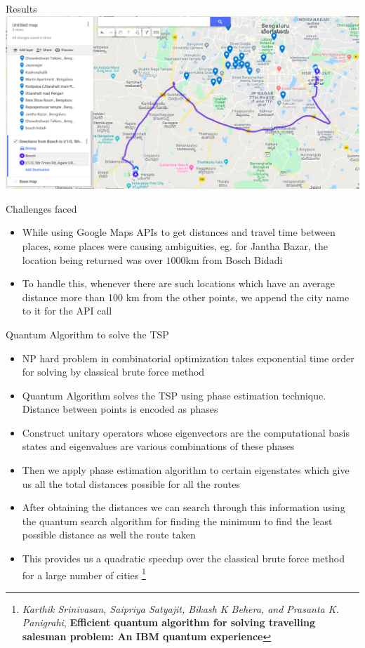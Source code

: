 \documentclass{beamer}
\begin{document}
\begin{frame}{Results}
    \includegraphics[width=\textwidth]{screen.png}
\end{frame}

\begin{frame}{Challenges faced}
\begin{itemize}[<+- | alert@+>]
    \item While using Google Maps APIs to get distances and travel time between places, some places were causing ambiguities, eg. for Jantha Bazar, the location being returned was over $1000$km from Bosch Bidadi
    \item To handle this, whenever there are such locations which have an average distance more than 100 km from the other points, we append the city name to it for the API call
\end{itemize}
\end{frame}
\begin{frame}{Quantum Algorithm to solve the TSP}
\begin{itemize}[<+- |alert@+>]
    \item NP hard problem in combinatorial optimization takes exponential time order for solving by classical brute force method
    \item Quantum Algorithm solves the TSP using phase estimation technique. Distance between points is encoded as phases
    \item Construct unitary operators whose eigenvectors are the computational basis states and eigenvalues are various combinations of these phases
    \item Then we apply phase estimation algorithm to certain eigenstates which give us all the total distances possible for all the routes
    \item After obtaining the distances we can search through this information using the quantum search algorithm for finding the minimum to find the least possible distance as well the route taken
    \item This provides us a quadratic speedup over the classical brute force method for a large number of cities
    \footnote{\textit{Karthik Srinivasan, Saipriya Satyajit, Bikash K Behera, and Prasanta K. Panigrahi}, \textbf{Efficient quantum algorithm for solving travelling salesman problem: An IBM quantum experience}}
\end{itemize}

\end{frame}
\end{document}
